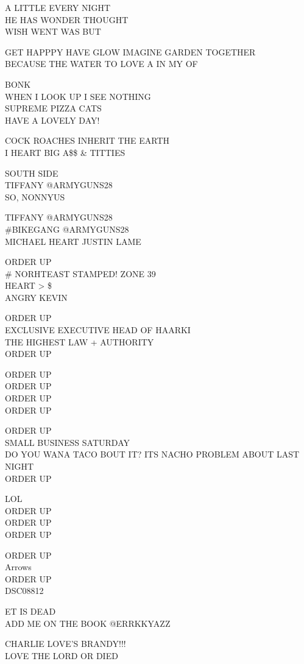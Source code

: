 \documentclass[10pt,letterpaper]{article}
\begin{document}
A LITTLE EVERY NIGHT\\
HE HAS WONDER THOUGHT\\
WISH WENT WAS BUT

GET HAPPPY HAVE GLOW IMAGINE GARDEN TOGETHER\\
BECAUSE THE WATER TO LOVE A IN MY OF

BONK\\
WHEN I LOOK UP I SEE NOTHING\\
SUPREME PIZZA CATS\\
HAVE A LOVELY DAY!

COCK ROACHES INHERIT THE EARTH\\
I HEART BIG A\$\$ \& TITTIES

SOUTH SIDE\\
TIFFANY @ARMYGUNS28\\
SO, NONNYUS

TIFFANY @ARMYGUNS28\\
\#BIKEGANG @ARMYGUNS28\\
MICHAEL HEART JUSTIN LAME

ORDER UP\\
\# NORHTEAST STAMPED! ZONE 39\\
HEART > \$\\
ANGRY KEVIN

ORDER UP\\
EXCLUSIVE EXECUTIVE HEAD OF HAARKI\\
THE HIGHEST LAW + AUTHORITY\\
ORDER UP

ORDER UP\\
ORDER UP\\
ORDER UP\\
ORDER UP

ORDER UP\\
SMALL BUSINESS SATURDAY\\
DO YOU WANA TACO BOUT IT?  ITS NACHO PROBLEM ABOUT LAST NIGHT\\
ORDER UP

LOL\\
ORDER UP\\
ORDER UP\\
ORDER UP

ORDER UP\\
Arrows\\
ORDER UP\\
DSC08812

ET IS DEAD\\
ADD ME ON THE BOOK @ERRKKYAZZ

CHARLIE LOVE'S BRANDY!!!\\
LOVE THE LORD OR DIED
\end{document}
